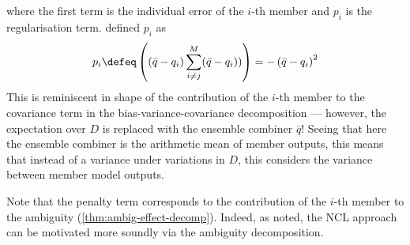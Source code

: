 \documentclass[../main.tex]{subfiles}
\begin{document}
where the first term is the individual error of the $i$-th member and $p_i$ is the regularisation term. \cite{liu_EnsembleLearningNegative_1999} defined $p_i$ as
$$
p_{i} \defeq \left( 
(\bar{q} - q_i)
\sum_{i \not=j}^M (\bar{q} - q_i))
\right)
= - \left(\bar{q} - q_i\right)^2
$$
This is reminiscent in shape of the contribution of the $i$-th member to the covariance term in the bias-variance-covariance decomposition --- however, the expectation over $D$ is replaced with the ensemble combiner $\bar{q}$! Seeing that here the ensemble combiner is the arithmetic mean of member outputs, this means that instead of a variance under variations in $D$, this considers the variance between member model outputs. 

Note that the penalty term corresponds to the contribution of the $i$-th member to the ambiguity (\cf \ref{thm:ambig-effect-decomp}).
Indeed, as \citeauthor{brown_ManagingDiversityRegression_2005} \cite{brown_ManagingDiversityRegression_2005} noted, the NCL approach can be motivated more soundly via the ambiguity decomposition. 
\end{document}
